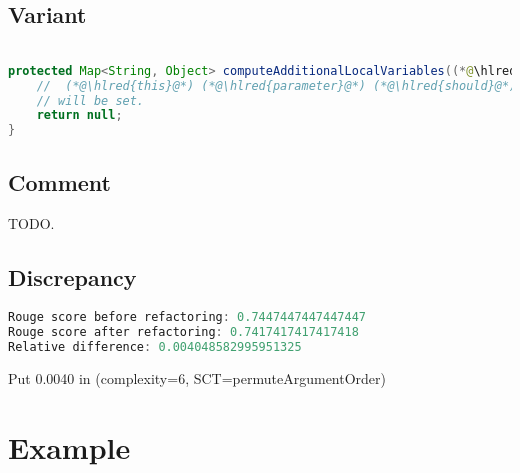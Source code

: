 \documentclass[11pt]{article}
\DeclareRobustCommand{\hlred}[1]{{\sethlcolor{YellowOrange}\hl{#1}}}
\begin{document}
\subsection{Variant}

\begin{lstlisting}[language=java]

protected Map<String, Object> computeAdditionalLocalVariables((*@\hlred{ }@*)final (*@\hlred{AttributeName}@*) (*@\hlred{attributeName}@*), final (*@\hlred{IStandardExpression}@*) (*@\hlred{expression}@*),final (*@\hlred{ITemplateContext}@*) (*@\hlred{context}@*), final (*@\hlred{IProcessableElementTag}@*) (*@\hlred{tag}@*), final (*@\hlred{String}@*) (*@\hlred{attributeValue}@*)) {
    //  (*@\hlred{this}@*) (*@\hlred{parameter}@*) (*@\hlred{should}@*) (*@\hlred{always}@*) (*@\hlred{exist}@*) (*@\hlred{since}@*) (*@\hlred{not}@*) (*@\hlred{more}@*) (*@\hlred{than}@*) (*@\hlred{this}@*) (*@\hlred{variable}@*) (*@\hlred{is expected to}@*)
    // will be set.
    return null;
}
\end{lstlisting}

\subsection{Comment}

TODO.

\subsection{Discrepancy}

\begin{lstlisting}[language=java]
Rouge score before refactoring: 0.7447447447447447
Rouge score after refactoring: 0.7417417417417418
Relative difference: 0.004048582995951325
\end{lstlisting}

Put 0.0040 in (complexity=6, SCT=permuteArgumentOrder)

\pagebreak
\section{Example}
\end{document}
